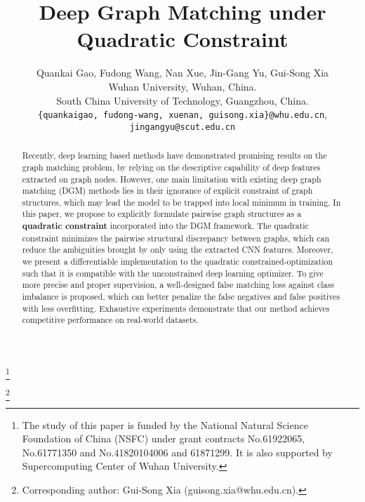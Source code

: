 \documentclass[final]{cvpr}
\newcommand\blfootnote[1]{\begingroup
  \renewcommand\thefootnote{}\footnote{#1}\addtocounter{footnote}{-1}\endgroup
}
\begin{document}
\title{Deep Graph Matching under Quadratic Constraint}

\author{Quankai Gao, Fudong Wang, Nan Xue, Jin-Gang Yu, Gui-Song Xia\\
Wuhan University, Wuhan, China.\\
South China University of Technology, Guangzhou, China.\\
{\tt\small \{quankaigao, fudong-wang, xuenan, guisong.xia\}@whu.edu.cn},
{\tt\small jingangyu@scut.edu.cn}


}

\maketitle

\blfootnote{The study of this paper is funded by the National Natural Science Foundation of China (NSFC) under grant contracts No.61922065, No.61771350 and No.41820104006 and 61871299. It is also supported by Supercomputing Center of Wuhan University.}
\blfootnote{
Corresponding author: Gui-Song Xia (guisong.xia@whu.edu.cn).}

\begin{abstract}
    Recently, deep learning based methods have demonstrated promising results on the graph matching problem, by relying on the descriptive capability of deep features extracted on graph nodes. However, one main limitation with existing deep graph matching (DGM) methods lies in their ignorance of explicit constraint of graph structures, which may lead the model to be trapped into local minimum in training. In this paper, we propose to explicitly formulate pairwise graph structures as a \textbf{quadratic constraint} incorporated into the DGM framework. The quadratic constraint minimizes the pairwise structural discrepancy between graphs, which can reduce the ambiguities brought by only using the extracted CNN features.
    Moreover, we present a differentiable implementation to the quadratic constrained-optimization such that it is compatible with the unconstrained deep learning optimizer. To give more precise and proper supervision, a well-designed false matching loss against class imbalance is proposed, which can better penalize the false negatives and false positives with less overfitting. Exhaustive experiments demonstrate that our method achieves competitive performance on real-world datasets.
\end{abstract}
\end{document}
